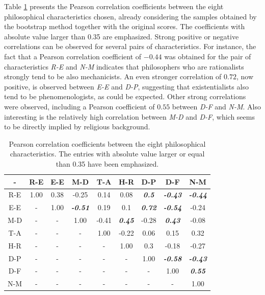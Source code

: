 \documentclass[%
 aip,
 jmp,%
 amsmath,amssymb,
 reprint,%
]{revtex4-1}
\begin{document}
Table \ref{tab:tableB} presents the Pearson correlation coefficients
between the eight philosophical characteristics chosen, already
considering the samples obtained by the bootstrap method together with
the original scores.  The
coefficients with absolute value larger than 0.35 are emphasized.
Strong positive or negative correlations can be observed for several
pairs of characteristics.  For instance, the fact that a Pearson
correlation coefficient of $-0.44$ was obtained for the pair of
characteristics \emph{R-E} and \emph{N-M} indicates that philosophers
who are rationalists strongly tend to be also mechanicists.  An even
stronger correlation of $0.72$, now positive, is observed between
\emph{E-E} and \emph{D-P}, suggesting that existentialists also tend
to be phenomenologists, as could be expected.  Other strong
correlations were observed, including a Pearson coefficient of $0.55$
between \emph{D-F} and \emph{N-M}.  Also interesting is the relatively
high correlation between \emph{M-D} and \emph{D-F}, which seems to be
directly implied by religious background.


\begin{table}\footnotesize%
\caption{\label{tab:tableB}Pearson correlation coefficients between the eight philosophical characteristics.  The entries with absolute
value larger or equal than 0.35 have been emphasized.}

\begin{ruledtabular}
\begin{tabular}{|c||c|c|c|c|c|c|c|c|}

- & R-E & E-E & M-D & T-A & H-R & D-P & D-F & N-M \\ \hline
R-E & 1.00 & 0.38 & -0.25 & 0.14 & 0.08 & {\bf \emph{  0.5}} & {\bf \emph{  -0.43}} & {\bf \emph{  -0.44}} \\
E-E & -    & 1.00 & {\bf \emph{  -0.51}} & 0.19 & 0.1 & {\bf \emph{  0.72}} & {\bf \emph{  -0.54}} & -0.24 \\
M-D & -    & -    & 1.00 & -0.41 & {\bf \emph{  0.45}} & -0.28 & {\bf \emph{  0.43}} & -0.08 \\
T-A & -    & -    & -    & 1.00 & -0.22 & 0.06  & 0.15 & 0.32 \\
H-R & -    & -    & -    & -    & 1.00 & 0.3 & -0.18 & -0.27 \\ 
D-P & -    & -    & -    & -    & -    & 1.00 & {\bf \emph{  -0.58}}  & {\bf \emph{  -0.43}} \\
D-F & -    & -    & -    & -    & -    & -    & 1.00 & {\bf \emph{  0.55}} \\
N-M & -    & -    & -    & -    & -    & -    & -    & 1.00 \\

\end{tabular}
\end{ruledtabular}
\end{table}
\end{document}
